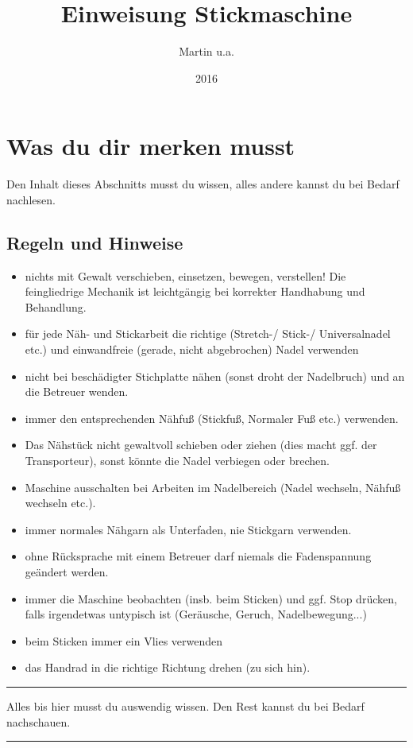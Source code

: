 \documentclass{\basedir/fablab-document}
\date{2016}
\author{Martin u.a.}
\title{Einweisung Stickmaschine}
\begin{document}
\maketitle

\section{Was du dir merken musst}
Den Inhalt dieses Abschnitts musst du wissen, alles andere kannst du bei Bedarf nachlesen.
\subsection{Regeln und Hinweise}
\begin{itemize}
 \item nichts mit Gewalt verschieben, einsetzen, bewegen, verstellen! Die feingliedrige Mechanik ist leichtgängig bei korrekter Handhabung und Behandlung.
 \item für jede Näh- und Stickarbeit die richtige (Stretch-/ Stick-/ Universalnadel etc.) und einwandfreie (gerade, nicht abgebrochen) Nadel verwenden
 \item nicht bei beschädigter Stichplatte nähen (sonst droht der Nadelbruch) und an die Betreuer wenden.
 \item immer den entsprechenden Nähfuß (Stickfuß, Normaler Fuß etc.) verwenden.
 \item Das Nähstück nicht gewaltvoll schieben oder ziehen (dies macht ggf. der Transporteur), sonst könnte die Nadel verbiegen oder brechen.
 \item Maschine ausschalten bei Arbeiten im Nadelbereich (Nadel wechseln, Nähfuß wechseln etc.).
 \item immer normales Nähgarn als Unterfaden, nie Stickgarn verwenden.
 \item ohne Rücksprache mit einem Betreuer darf niemals die Fadenspannung geändert werden.
 \item immer die Maschine beobachten (insb. beim Sticken) und ggf. Stop drücken, falls irgendetwas untypisch ist (Geräusche, Geruch, Nadelbewegung...)
 \item beim Sticken immer ein Vlies verwenden
 \item das Handrad in die richtige Richtung drehen (zu sich hin).
\end{itemize}

\vspace{5em}
\hrule

Alles bis hier musst du auswendig wissen. Den Rest kannst du bei Bedarf nachschauen.
\vspace{0.2em}
\hrule
\vspace{3em}
\end{document}
